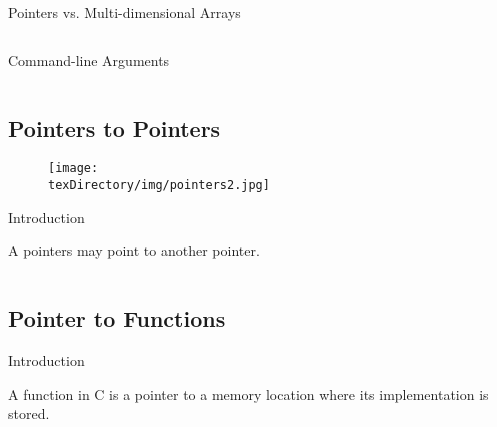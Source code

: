 \documentclass[compress]{beamer}
\begin{document}
\begin{slide}
	\begin{block}{Pointers vs. Multi-dimensional Arrays}

	\inputminted[fontsize=\footnotesize, firstline=10, linenos]{c}{
		\resDirectory/array4.c
	}

	\end{block}
\end{slide}

\begin{slide}
	\begin{block}{Command-line Arguments}

	\inputminted[fontsize=\footnotesize, firstline=10, linenos]{c}{
		\resDirectory/cmdargs.c
	}

	\end{block}
\end{slide}

\subsection{Pointers to Pointers}

\begin{slide}
	\begin{figure}
	\texttt{[image: \\texDirectory/img/pointers2.jpg]}
	\end{figure}
\end{slide}

\begin{slide}
	\begin{block}{Introduction}

	A pointers may point to another pointer.

	\inputminted[fontsize=\footnotesize, firstline=10, linenos]{c}{
		\resDirectory/ptrptr1.c
	}

	\end{block}
\end{slide}

\subsection{Pointer to Functions}

\begin{slide}
	\begin{block}{Introduction}

	A function in C is a pointer to a memory location where its implementation is stored.

	\end{block}
\end{slide}
\end{document}
